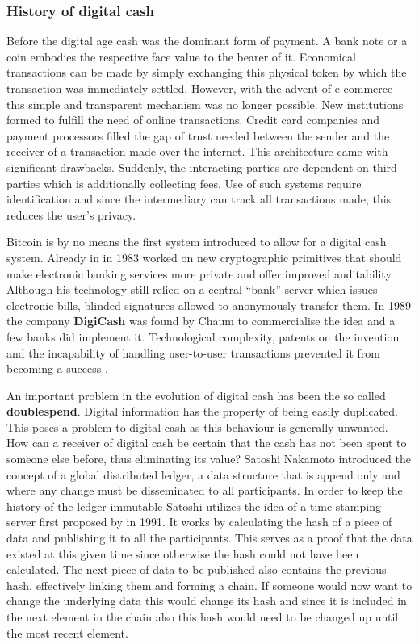 \documentclass[final]{fhnwreport}       %
\begin{document}
\subsubsection{History of digital cash}
Before the digital age cash was the dominant form of payment. A bank note or a coin embodies the respective face value to the bearer of it. Economical transactions can be made by simply exchanging this physical token by which the transaction was immediately settled. However, with the advent of e-commerce this simple and transparent mechanism was no longer possible. New institutions formed to fulfill the need of online transactions. Credit card companies and payment processors filled the gap of trust needed between the sender and the receiver of a transaction made over the internet. This architecture came with significant drawbacks. Suddenly, the interacting parties are dependent on third parties which is additionally collecting fees. Use of such systems require identification and since the intermediary can track all transactions made, this reduces the user's privacy. \cite{narayanan_bitcoin_2016} 

Bitcoin is by no means the first system introduced to allow for a digital cash system. Already in in 1983 \textcite{chaum_blind_1983} worked on new cryptographic primitives that should make electronic banking services more private and offer improved auditability. Although his technology still relied on a central ``bank'' server which issues electronic bills, blinded signatures allowed to anonymously transfer them. In 1989 the company \textbf{DigiCash} was found by Chaum to commercialise the idea and a few banks did implement it. Technological complexity, patents on the invention and the incapability of handling  user-to-user transactions prevented it from becoming a success \cite{narayanan_bitcoin_2016}. 

An important problem in the evolution of digital cash has been the so called \textbf{\gls{doublespend}}. Digital information has the property of being easily duplicated. This poses a problem to digital cash as this behaviour is generally unwanted. How can a receiver of digital cash be certain that the cash has not been spent to someone else before, thus eliminating its value? Satoshi Nakamoto introduced the concept of a global distributed ledger, a data structure that is append only and where any change must be disseminated to all participants. In order to keep the history of the ledger immutable Satoshi utilizes the idea of a time stamping server first proposed by \textcite{haber_how_1991} in 1991. It works by calculating the hash of a piece of data and publishing it to all the participants. This serves as a proof that the data existed at this given time since otherwise the hash could not have been calculated. The next piece of data to be published also contains the previous hash, effectively linking them and forming a chain. If someone would now want to change the underlying data this would change its hash and since it is included in the next element in the chain also this hash would need to be changed up until the most recent element. 
\end{document}
